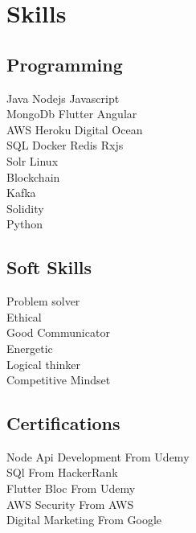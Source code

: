 \documentclass[]{deedy-resume-openfont}
\begin{document}
\begin{minipage}[t]{0.33\textwidth}
\sectionsep



\section{Skills}
\sectionsep
\subsection{Programming}
\sectionsep
\textbullet{} Java \textbullet{}   Nodejs  \textbullet{} Javascript \\
\textbullet{} MongoDb \textbullet{} Flutter \textbullet{} Angular  \\

\textbullet{} AWS \textbullet{} Heroku  \textbullet{} Digital Ocean \\  \textbullet{} SQL \textbullet{} Docker  \textbullet{} Redis \textbullet{} 
Rxjs \\ \textbullet{} Solr \textbullet{} Linux \\
\sectionsep
{}
\sectionsep
\textbullet{} Blockchain  \\ \textbullet{} Kafka \\ \textbullet{} Solidity \\ \textbullet{} Python
\sectionsep

\sectionsep
\subsection{Soft Skills}

\sectionsep
 \textbullet{} Problem solver \\ \textbullet{}   Ethical \\  \textbullet{} 
Good Communicator \\
 \textbullet{} Energetic \\ \textbullet{} Logical thinker \\
\textbullet{} Competitive Mindset  \\

\sectionsep

\sectionsep
\subsection{Certifications}

\sectionsep
 \textbullet{} Node Api Development From Udemy\\ 
 \textbullet{} SQl From HackerRank\\ \textbullet{}   Flutter Bloc From Udemy\\  \textbullet{} 
AWS Security From AWS \\
 \textbullet{} Digital Marketing From Google\\ 
 

\sectionsep

%
%

\end{minipage} 
\end{document}
